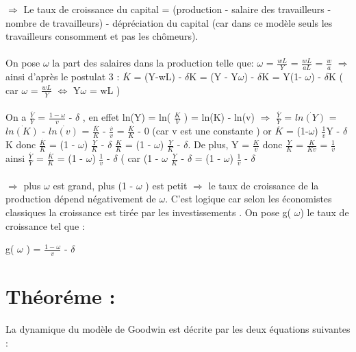 \documentclass{article}
\begin{document}
$\Rightarrow$ Le taux de croissance du capital = (production - salaire des travailleurs - nombre de travailleurs) - dépréciation du capital (car dans ce modèle seuls les travailleurs consomment et pas les chômeurs).
\\\\
On pose $\omega$ la part des salaires dans la production telle que: $\omega$ = $\frac{wL}{Y}$ = $\frac{wL}{aL}$ = $\frac{w}{a}$ $\Rightarrow$ ainsi d'après le postulat 3 : $\stackrel{.}{K}$ = (Y-wL) - $\delta$K = (Y - Y$\omega$) - $\delta$K = Y(1- $\omega$) - $\delta$K ( car $\omega$ = $\frac{wL}{Y}$ $\Leftrightarrow$ Y$\omega$ = wL )
\\\\
On a $\frac{\stackrel{.}{Y}}{Y}$ = $\frac{1-\omega}{v}$ - $\delta$ , en effet ln(Y) = ln( $\frac{K}{V}$ ) = ln(K) - ln(v) $\Rightarrow$ $\frac{\stackrel{.}{Y}}{Y}$ = $\stackrel{.}{ln(Y)}$ = $\stackrel{.}{ln(K)}$ - $\stackrel{.}{ln(v)}$ = $\frac{\stackrel{.}{K}}{K}$ - $\frac{\stackrel{.}{v}}{v}$ = $\frac{\stackrel{.}{K}}{K}$ - 0 (car v est une constante ) or $\stackrel{.}{K}$ = (1-$\omega$) $\frac{1}{v}$Y - $\delta$K donc $\frac{\stackrel{.}{K}}{K}$ = (1 - $\omega$) $\frac{Y}{K}$ - $\delta$ $\frac{K}{K}$ = (1 - $\omega$) $\frac{Y}{K}$ - $\delta$. De plus, Y = $\frac{K}{v}$ donc $\frac{Y}{K}$ = $\frac{K}{Kv}$
= $\frac{1}{v}$ ainsi $\frac{\stackrel{.}{Y}}{Y}$ = $\frac{\stackrel{.}{K}}{K}$ = (1 - $\omega$) $\frac{1}{v}$ - $\delta$ ( car (1 - $\omega$ $\frac{Y}{K}$ - $\delta$ = (1 - $\omega$) $\frac{1}{v}$ - $\delta$ 
\\\\
$\Rightarrow$ plus $\omega$ est grand, plus (1 - $\omega$ ) est petit $\Rightarrow$ le taux de croissance de la production dépend négativement de $\omega$. C'est logique car selon les économistes classiques la croissance est tirée par les investissements . On pose g( $\omega$) le taux de croissance tel que :

g( $\omega$ ) = $\frac{1- \omega}{v}$ - $\delta$

\section{Théoréme :} 

La dynamique du modèle de Goodwin est décrite par les deux équations suivantes : 
\end{document}

